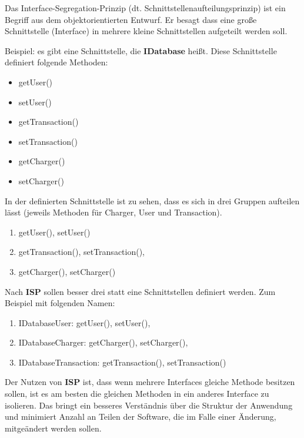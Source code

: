 Das Interface-Segregation-Prinzip (dt. Schnittstellenaufteilungsprinzip) 
ist ein Begriff aus dem objektorientierten Entwurf. Er besagt dass eine große Schnittstelle (Interface) 
in mehrere kleine Schnittstellen aufgeteilt werden soll.

Beispiel: es gibt eine Schnittstelle, die \textbf{IDatabase} heißt. 
Diese Schnittstelle definiert folgende Methoden:
\begin{itemize}
    \item getUser()
    \item setUser()
    \item getTransaction()
    \item setTransaction()
    \item getCharger()
    \item setCharger()
\end{itemize}

In der definierten Schnittstelle ist zu sehen, 
dass es sich in drei Gruppen aufteilen lässt (jeweils Methoden für Charger, User und Transaction).
\begin{enumerate}
    \item getUser(), setUser()
    \item getTransaction(), setTransaction(),
    \item getCharger(), setCharger()
\end{enumerate}

Nach \textbf{ISP} sollen besser drei statt eine Schnittstellen definiert werden.
Zum Beispiel mit folgenden Namen:
\begin{enumerate}
    \item IDatabaseUser: getUser(), setUser(),
    \item IDatabaseCharger: getCharger(), setCharger(),
    \item IDatabaseTransaction: getTransaction(), setTransaction()
\end{enumerate}

Der Nutzen von \textbf{ISP} ist,
dass wenn mehrere Interfaces gleiche Methode besitzen sollen, 
ist es am besten die gleichen Methoden in ein anderes Interface zu isolieren.
Das bringt ein besseres Verständnis über die Struktur der Anwendung und 
minimiert Anzahl an Teilen der Software, 
die im Falle einer Änderung, mitgeändert werden sollen.